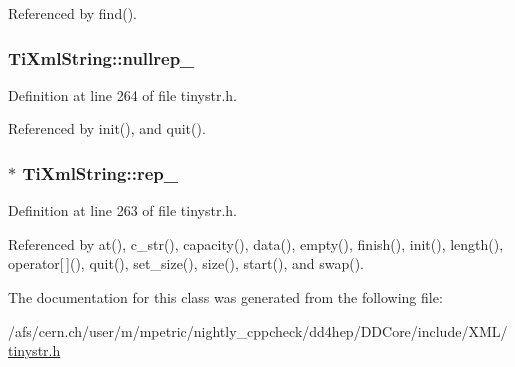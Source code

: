 Referenced by find().\hypertarget{class_ti_xml_string_a345791f81a4b1da64404886f3b2c244d}{
\subsubsection[{nullrep\_\-}]{ {\bf TiXmlString::nullrep\_\-}}}
\label{class_ti_xml_string_a345791f81a4b1da64404886f3b2c244d}


Definition at line 264 of file tinystr.h.

Referenced by init(), and quit().\hypertarget{class_ti_xml_string_ac7be48f31ca451bcb16de428b5c40e0c}{
\subsubsection[{rep\_\-}]{$\ast$ {\bf TiXmlString::rep\_\-}}}
\label{class_ti_xml_string_ac7be48f31ca451bcb16de428b5c40e0c}


Definition at line 263 of file tinystr.h.

Referenced by at(), c\_\-str(), capacity(), data(), empty(), finish(), init(), length(), operator\mbox{[}$\,$\mbox{]}(), quit(), set\_\-size(), size(), start(), and swap().

The documentation for this class was generated from the following file:\begin{DoxyCompactItemize}
\item 
/afs/cern.ch/user/m/mpetric/nightly\_\-cppcheck/dd4hep/DDCore/include/XML/\hyperlink{tinystr_8h}{tinystr.h}\end{DoxyCompactItemize}
